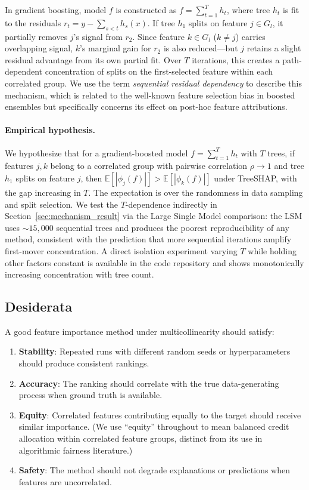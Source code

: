 \documentclass[11pt]{article}
\newcommand{\rhovar}{\rho}
\begin{document}
In gradient boosting, model $f$ is constructed as $f =
\sum_{t=1}^{T} h_t$, where tree $h_t$ is fit to the residuals
$r_t = y - \sum_{s<t} h_s(x)$. If tree $h_1$ splits on feature $j \in
G_l$, it partially removes $j$'s signal from $r_2$. Since feature $k
\in G_l$ ($k \neq j$) carries overlapping signal, $k$'s marginal gain
for $r_2$ is also reduced---but $j$ retains a slight residual advantage
from its own partial fit. Over $T$ iterations, this creates a
path-dependent concentration of splits on the first-selected feature
within each correlated group. We use the term \emph{sequential residual
dependency} to describe this mechanism, which is related to the
well-known feature selection bias in boosted ensembles but specifically
concerns its effect on post-hoc feature attributions.

\paragraph{Empirical hypothesis.}
We hypothesize that for a gradient-boosted model $f = \sum_{t=1}^{T} h_t$
with $T$ trees, if features $j, k$ belong to a correlated group with
pairwise correlation $\rhovar \to 1$ and tree $h_1$ splits on feature
$j$, then $\mathbb{E}[|\phi_j(f)|] > \mathbb{E}[|\phi_k(f)|]$ under
TreeSHAP, with the gap increasing in $T$. The expectation is over the
randomness in data sampling and split selection. We test the $T$-dependence
indirectly in Section~\ref{sec:mechanism_result} via the Large Single
Model comparison: the LSM uses ${\sim}15{,}000$ sequential trees and
produces the poorest reproducibility of any method, consistent with the
prediction that more sequential iterations amplify first-mover
concentration. A direct isolation experiment varying $T$ while holding
other factors constant is available in the code repository and shows
monotonically increasing concentration with tree count.

\subsection{Desiderata}

A good feature importance method under multicollinearity should satisfy:
\begin{enumerate}
  \item \textbf{Stability}: Repeated runs with different random seeds or
    hyperparameters should produce consistent rankings.
  \item \textbf{Accuracy}: The ranking should correlate with the true
    data-generating process when ground truth is available.
  \item \textbf{Equity}: Correlated features contributing equally to the
    target should receive similar importance. (We use ``equity'' throughout
    to mean balanced credit allocation within correlated feature groups,
    distinct from its use in algorithmic fairness literature.)
  \item \textbf{Safety}: The method should not degrade explanations or
    predictions when features are uncorrelated.
\end{enumerate}
\end{document}
